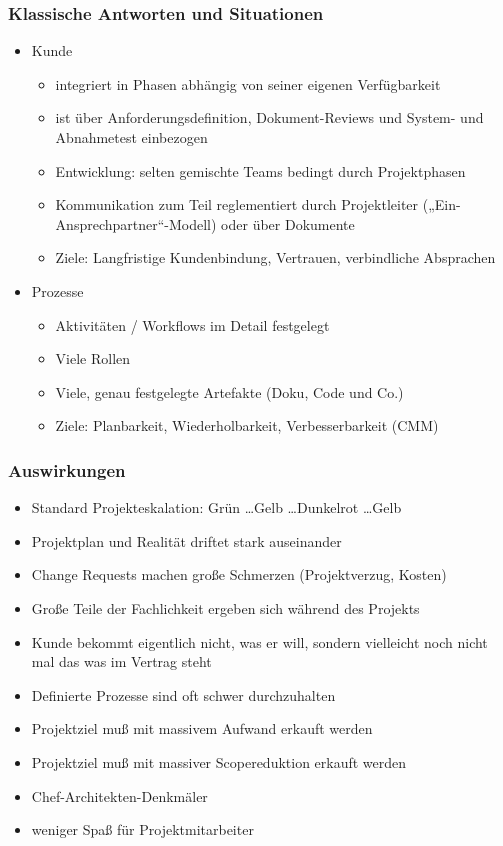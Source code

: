  \frame
 {
   \frametitle{Klassische Antworten und Situationen}
   \begin{itemize}
 
   \item{Kunde
    \begin{itemize}
     \item{integriert in Phasen  abhängig von seiner eigenen Verfügbarkeit}
     \item{ist über Anforderungsdefinition, Dokument-Reviews und System- und Abnahmetest einbezogen}
     \item{Entwicklung: selten gemischte Teams bedingt durch Projektphasen}
     \item{Kommunikation zum Teil reglementiert durch Projektleiter („Ein-Ansprechpartner“-Modell) oder über Dokumente}
     \item{Ziele: Langfristige Kundenbindung, Vertrauen, verbindliche Absprachen}
    \end{itemize}
   }
   \item{Prozesse
    \begin{itemize}
     \item{Aktivitäten / Workflows im Detail festgelegt}
     \item{Viele Rollen}
     \item{Viele, genau festgelegte Artefakte (Doku, Code und Co.)}
     \item{Ziele: Planbarkeit, Wiederholbarkeit, Verbesserbarkeit (CMM)}
    \end{itemize}
   }
   \end{itemize}
 }

 \frame
 {
   \frametitle{Auswirkungen}
   \begin{itemize}
      \item{Standard Projekteskalation: Grün \dots Gelb \dots Dunkelrot \dots Gelb} 
      \item{Projektplan und Realität driftet stark auseinander}
      \item{Change Requests machen große Schmerzen (Projektverzug, Kosten)}
      \item{Große Teile der Fachlichkeit ergeben sich während des Projekts}
      \item{Kunde bekommt eigentlich nicht, was er will, sondern vielleicht noch nicht mal das was im Vertrag steht}
      \item{Definierte Prozesse sind oft schwer durchzuhalten}
      \item{Projektziel muß mit massivem Aufwand erkauft werden}
      \item{Projektziel muß mit massiver Scopereduktion erkauft werden}
      \item{Chef-Architekten-Denkmäler}
      \item{weniger Spaß für Projektmitarbeiter}
   \end{itemize}
 }



